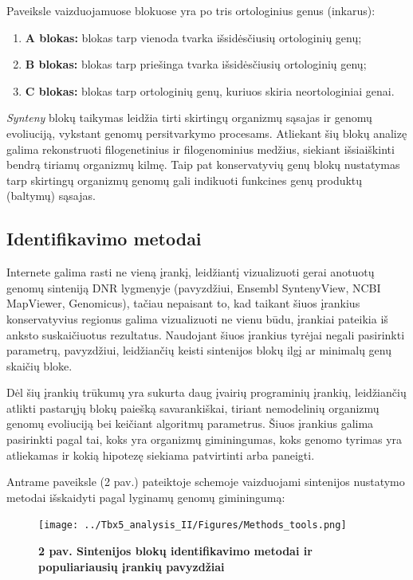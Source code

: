 \documentclass[12pt]{article}
\begin{document}
Paveiksle vaizduojamuose blokuose yra po tris ortologinius genus (inkarus):
\begin{enumerate}
    \item \textbf{A blokas:} blokas tarp vienoda tvarka išsidėsčiusių
    ortologinių genų;
    \item \textbf{B blokas:} blokas tarp priešinga tvarka išsidėsčiusių
    ortologinių genų;
    \item \textbf{C blokas:} blokas tarp ortologinių genų, kuriuos skiria
    neortologiniai genai.
\end{enumerate}

\emph{Synteny} blokų taikymas leidžia tirti skirtingų organizmų sąsajas ir
genomų evoliuciją, vykstant genomų persitvarkymo procesams. Atliekant šių
blokų analizę galima rekonstruoti filogenetinius ir filogenominius
medžius\cite{PHYLO_REF}, siekiant išsiaiškinti bendrą tiriamų organizmų kilmę.
Taip pat konservatyvių genų blokų nustatymas tarp skirtingų organizmų genomų
gali indikuoti funkcines genų produktų (baltymų) sąsajas\cite{FUNC_REF}.

\newpage

\subsection{Identifikavimo metodai}
Internete galima rasti ne vieną įrankį, leidžiantį vizualizuoti gerai anotuotų
genomų sinteniją DNR lygmenyje (pavyzdžiui, Ensembl SyntenyView\cite{ENS_SYN},
NCBI MapViewer\cite{NCBI_MAP}, Genomicus\cite{GENOMICUS}), tačiau nepaisant to,
kad taikant šiuos įrankius konservatyvius regionus galima vizualizuoti ne vienu
būdu, įrankiai pateikia iš anksto suskaičiuotus rezultatus. Naudojant šiuos
įrankius tyrėjai negali pasirinkti parametrų, pavyzdžiui, leidžiančių keisti
sintenijos blokų ilgį ar minimalų genų skaičių bloke.

Dėl šių įrankių trūkumų yra sukurta daug įvairių programinių įrankių,
leidžiančių atlikti pastarųjų blokų paiešką savarankiškai, tiriant nemodelinių
organizmų genomų evoliuciją bei keičiant algoritmų parametrus. Šiuos įrankius
galima pasirinkti pagal tai, koks yra organizmų giminingumas, koks genomo
tyrimas yra atliekamas ir kokią hipotezę siekiama patvirtinti arba paneigti.

Antrame paveiksle (2 pav.) pateiktoje schemoje vaizduojami sintenijos nustatymo
metodai išskaidyti pagal lyginamų genomų giminingumą:

\begin{figure}[htb]
    \begin{center}
        \texttt{[image: ../Tbx5\_analysis\_II/Figures/Methods\_tools.png]}
        \vspace{-2\baselineskip}
        \caption*{\small\textbf{2 pav. Sintenijos blokų identifikavimo
        metodai ir populiariausių įrankių pavyzdžiai}}
        \label{fig:birds}
    \end{center}
\end{figure}
\end{document}
